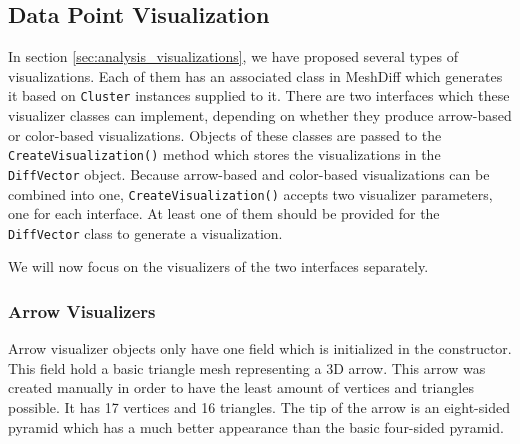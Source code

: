 \subsection{Data Point Visualization}
\label{sec:implementation_visualizers}

In section \ref{sec:analysis_visualizations}, we have proposed several types of visualizations. Each of them has an associated class in MeshDiff which generates it based on \verb+Cluster+ instances supplied to it. There are two interfaces which these visualizer classes can implement, depending on whether they produce arrow-based or color-based visualizations. Objects of these classes are passed to the \verb+CreateVisualization()+ method which stores the visualizations in the \verb+DiffVector+ object. Because arrow-based and color-based visualizations can be combined into one, \verb+CreateVisualization()+ accepts two visualizer parameters, one for each interface. At least one of them should be provided for the \verb+DiffVector+ class to generate a visualization.

We will now focus on the visualizers of the two interfaces separately.

\subsubsection{Arrow Visualizers}

Arrow visualizer objects only have one field which is initialized in the constructor. This field hold a basic triangle mesh representing a 3D arrow. This arrow was created manually in order to have the least amount of vertices and triangles possible. It has 17 vertices and 16 triangles. The tip of the arrow is an eight-sided pyramid which has a much better appearance than the basic four-sided pyramid.

